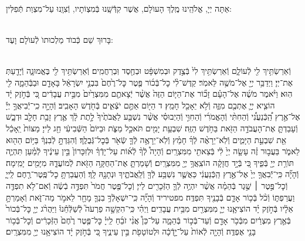 \documentclass[twoside, openany, parskip=half, 11pt]{book}
\begin{document}
\\
אַתָּה יְיָ, אֱלֹהֵֽינוּ מֶֽלֶךְ הָעוֺלָם, אֲשֶׁר קִדְּֿֿשָֽׁנוּ בְּֿמִצְוֹתָיו, וְֿצִוָֽנוּ עַל־מִצְוַת תְּֿפִלִּין:

\\
בָּרוּךְ שֵׁם כְּֿבוֺד מַלְכוּתוֺ לְֿעוֺלָם וָעֶד:


\\
וְֿאֵרַשְׂתִּ֥יךְ לִ֖י לְֿעוֹלָ֑ם וְֿאֵרַשְׂתִּ֥יךְ לִי֙ בְּֿצֶ֣דֶק וּבְמִשְׁפָּ֔ט וּבְחֶ֖סֶד וּֽבְרַחֲמִֽים׃ וְֿאֵרַשְׂתִּ֥יךְ לִ֖י בֶּאֱמוּנָ֑ה וְֿיָדַ֖עַתְּ אֶת־יְיָ׃
וַיְדַבֵּ֥ר יְיָ֖ אֶל־מֹשֶׁ֥ה לֵּאמֹֽר׃ קַדֶּשׁ־לִ֨י כׇל־בְּֿכ֜וֹר פֶּ֤טֶר כׇּל־רֶ֙חֶם֙ בִּבְנֵ֣י יִשְׂרָאֵ֔ל בָּאָדָ֖ם וּבַבְּֿהֵמָ֑ה לִ֖י הֽוּא׃ וַיֹּ֨אמֶר מֹשֶׁ֜ה אֶל־הָעָ֗ם זָכ֞וֹר אֶת־הַיּ֤וֹם הַזֶּה֙ אֲשֶׁ֨ר יְֿצָאתֶ֤ם מִמִּצְרַ֙יִם֙ מִבֵּ֣ית עֲבָדִ֔ים כִּ֚י בְּֿחֹ֣זֶק יָ֔ד הוֹצִ֧יא יְיָ֛ אֶתְכֶ֖ם מִזֶּ֑ה וְֿלֹ֥א יֵאָכֵ֖ל חָמֵֽץ׃ ד הַיּ֖וֹם אַתֶּ֣ם יֹצְֿאִ֑ים בְּֿחֹ֖דֶשׁ הָאָבִֽיב׃ וְֿהָיָ֣ה כִֽי־יְֿֿבִיאֲךָ֣ יְיָ֡ אֶל־אֶ֣רֶץ הַֽ֠כְּֿנַעֲנִ֠י וְֿהַחִתִּ֨י וְֿהָאֱמֹרִ֜י וְֿהַחִוִּ֣י וְֿהַיְבוּסִ֗י אֲשֶׁ֨ר נִשְׁבַּ֤ע לַאֲבֹתֶ֙יךָ֙ לָ֣תֶת לָ֔ךְ אֶ֛רֶץ זָבַ֥ת חָלָ֖ב וּדְבָ֑שׁ וְֿעָבַדְתָּ֛ אֶת־הָעֲבֹדָ֥ה הַזֹּ֖את בַּחֹ֥דֶשׁ הַזֶּֽה׃ שִׁבְעַ֥ת יָמִ֖ים תֹּאכַ֣ל מַצֹּ֑ת וּבַיּוֹם֙ הַשְּֿׁבִיעִ֔י חַ֖ג לַייָ׃ מַצּוֹת֙ יֵֽאָכֵ֔ל אֵ֖ת שִׁבְעַ֣ת הַיָּמִ֑ים וְֿלֹֽא־יֵרָאֶ֨ה לְֿךָ֜ חָמֵ֗ץ וְֿלֹֽא־יֵרָאֶ֥ה לְֿךָ֛ שְֿׂאֹ֖ר בְּֿכׇל־גְּֿבֻלֶֽךָ׃ וְֿהִגַּדְתָּ֣ לְֿבִנְךָ֔ בַּיּ֥וֹם הַה֖וּא לֵאמֹ֑ר בַּעֲב֣וּר זֶ֗ה עָשָׂ֤ה יְיָ֙ לִ֔י בְּֿצֵאתִ֖י מִמִּצְרָֽיִם׃ וְֿהָיָה֩ לְֿךָ֨ לְֿא֜וֹת עַל־יָדְֿךָ֗ וּלְזִכָּרוֹן֙ בֵּ֣ין עֵינֶ֔יךָ לְֿמַ֗עַן תִּהְיֶ֛ה תּוֹרַ֥ת יְיָ֖ בְּֿפִ֑יךָ כִּ֚י בְּֿיָ֣ד חֲזָקָ֔ה הוֹצִֽאֲךָ֥ יְיָ֖ מִמִּצְרָֽיִם׃ וְֿשָׁמַרְתָּ֛ אֶת־הַחֻקָּ֥ה הַזֹּ֖את לְֿמוֹעֲדָ֑הּ מִיָּמִ֖ים יָמִֽימָה׃\\

וְֿהָיָ֞ה כִּֽי־יְֿֿבִאֲךָ֤ יְיָ֙ אֶל־אֶ֣רֶץ הַֽכְּֿנַעֲנִ֔י כַּאֲשֶׁ֛ר נִשְׁבַּ֥ע לְֿךָ֖ וְֿלַֽאֲבֹתֶ֑יךָ וּנְתָנָ֖הּ לָֽךְ׃ וְֿהַעֲבַרְתָּ֥ כׇל־פֶּֽטֶר־רֶ֖חֶם לַֽייָ֑ וְֿכׇל־פֶּ֣טֶר ׀ שֶׁ֣גֶר בְּֿהֵמָ֗ה אֲשֶׁ֨ר יִהְיֶ֥ה לְֿךָ֛ הַזְּֿכָרִ֖ים לַייָ׃ וְֿכׇל־פֶּ֤טֶר חֲמֹר֙ תִּפְדֶּ֣ה בְֿשֶׂ֔ה וְֿאִם־לֹ֥א תִפְדֶּ֖ה וַעֲרַפְתּ֑וֹ וְֿכֹ֨ל בְּֿכ֥וֹר אָדָ֛ם בְּֿבָנֶ֖יךָ תִּפְדֶּֽה׃ מפטיריד וְֿהָיָ֞ה כִּֽי־יִשְׁאָלְֿךָ֥ בִנְךָ֛ מָחָ֖ר לֵאמֹ֣ר מַה־זֹּ֑את וְֿאָמַרְתָּ֣ אֵלָ֔יו בְּֿחֹ֣זֶק יָ֗ד הוֹצִיאָ֧נוּ יְיָ֛ מִמִּצְרַ֖יִם מִבֵּ֥ית עֲבָדִֽים׃ וַיְהִ֗י כִּֽי־הִקְשָׁ֣ה פַרְעֹה֮ לְֿשַׁלְּֿחֵ֒נוּ֒ וַיַּהֲרֹ֨ג יְיָ֤ כׇּל־בְּֿכוֹר֙ בְּֿאֶ֣רֶץ מִצְרַ֔יִם מִבְּֿכֹ֥ר אָדָ֖ם וְֿעַד־בְּֿכ֣וֹר בְּֿהֵמָ֑ה עַל־כֵּן֩ אֲנִ֨י זֹבֵ֜חַ לַֽייָ֗ כׇּל־פֶּ֤טֶר רֶ֙חֶם֙ הַזְּֿכָרִ֔ים וְֿכׇל־בְּֿכ֥וֹר בָּנַ֖י אֶפְדֶּֽה׃ וְֿהָיָ֤ה לְֿאוֹת֙ עַל־יָ֣דְֿכָ֔ה וּלְטוֹטָפֹ֖ת בֵּ֣ין עֵינֶ֑יךָ כִּ֚י בְּֿחֹ֣זֶק יָ֔ד הוֹצִיאָ֥נוּ יְיָ֖ מִמִּצְרָֽיִם׃
\end{document}

